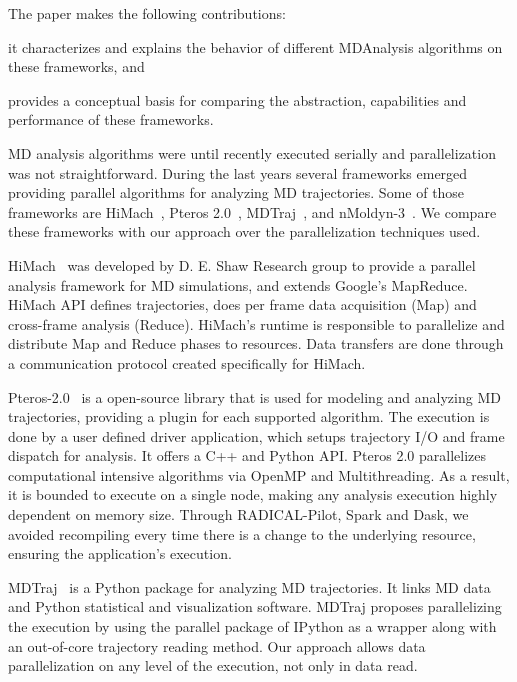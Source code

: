 \label{sec:task-par}
The paper makes the following contributions: 
\begin{inparaenum}[i)]
    \item it characterizes and explains the behavior of different MDAnalysis algorithms on these frameworks, and
    \item provides a conceptual basis for comparing the abstraction, capabilities and performance of these frameworks.
\end{inparaenum}

MD analysis algorithms were until recently executed serially and parallelization was not straightforward.
During the last years several frameworks emerged providing parallel algorithms for analyzing MD trajectories.
Some of those frameworks are HiMach~\cite{tiankai2008scalable}, Pteros 2.0~\cite{yesylevskyy2015pteros}, MDTraj~\cite{mcgibbon2015mdtraj}, and nMoldyn-3~\cite{hinsen2012nmoldyn}.
We compare these frameworks with our approach over the parallelization techniques used.

HiMach~\cite{tiankai2008scalable} was developed by D. E. Shaw Research group to provide a parallel analysis framework for MD simulations, and extends Google's MapReduce.
HiMach API defines trajectories, does per frame data acquisition (Map) and cross-frame analysis (Reduce).
HiMach's runtime is responsible to parallelize and distribute Map and Reduce phases to resources.
Data transfers are done through a communication protocol created specifically for HiMach.

Pteros-2.0~\cite{yesylevskyy2015pteros} is a open-source library that is used for modeling and analyzing MD trajectories, providing a plugin for each supported algorithm.
The execution is done by a user defined driver application, which setups trajectory  I/O and frame dispatch for analysis.
It offers a C++ and Python API.
Pteros 2.0 parallelizes computational intensive algorithms via OpenMP and Multithreading.
As a result, it is bounded to execute on a single node, making any analysis execution highly dependent on memory size.
Through RADICAL-Pilot, Spark and Dask, we avoided recompiling every time there is a change to the underlying resource, ensuring the application's execution.

MDTraj~\cite{mcgibbon2015mdtraj} is a Python package for analyzing MD trajectories.
It links MD data and Python statistical and visualization software.
MDTraj proposes parallelizing the execution by using the parallel package of IPython as a wrapper along with an out-of-core trajectory reading method.
Our approach allows data parallelization on any level of the execution, not only in data read.

